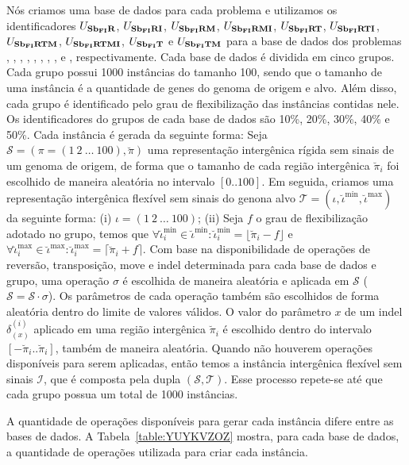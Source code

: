 Nós criamos uma base de dados para cada problema e utilizamos os identificadores $U_{\textbf{Sb\textsubscript{FI}R}}{}$, $U_{\textbf{Sb\textsubscript{FI}RI}}{}$, $U_{\textbf{Sb\textsubscript{FI}RM}}{}$, $U_{\textbf{Sb\textsubscript{FI}RMI}}{}$, $U_{\textbf{Sb\textsubscript{FI}RT}}{}$, $U_{\textbf{Sb\textsubscript{FI}RTI}}{}$, $U_{\textbf{Sb\textsubscript{FI}RTM}}{}$, $U_{\textbf{Sb\textsubscript{FI}RTMI}}{}$, $U_{\textbf{Sb\textsubscript{FI}T}}{}$ e $U_{\textbf{Sb\textsubscript{FI}TM}}{}$ para a base de dados dos problemas \SbFIR{}, \SbFIRI{}, \SbFIRM{}, \SbFIRMI{}, \SbFIRT{}, \SbFIRTI{}, \SbFIRTM{}, \SbFIRTMI{}, \SbFIT{} e \SbFITM{}, respectivamente. Cada base de dados é dividida em cinco grupos. Cada grupo possui 1000 instâncias do tamanho 100, sendo que o tamanho de uma instância é a quantidade de genes do genoma de origem e alvo. Além disso, cada grupo é identificado pelo grau de flexibilização das instâncias contidas nele. Os identificadores do grupos de cada base de dados são 10\%, 20\%, 30\%, 40\% e 50\%. Cada instância é gerada da seguinte forma: Seja $\mathcal{S} = (\pi =(1~2~\dots~100),\breve\pi)$ uma representação intergênica rígida sem sinais de um genoma de origem, de forma que o tamanho de cada região intergênica $\breve\pi_i$ foi escolhido de maneira aleatória no intervalo $[0..100]$. Em seguida, criamos uma representação intergênica flexível sem sinais do genona alvo $\mathcal{T} = (\iota, \breve\iota^{\min},\breve\iota^{\max})$ da seguinte forma: (i) $\iota =(1~2~\dots~100)$; (ii) Seja $f$ o grau de flexibilização adotado no grupo, temos que $\forall \breve\iota^{\min}_i \in \breve\iota^{\min}: \breve\iota^{\min}_i = \lfloor\breve\pi_i - f\rfloor$ e $\forall \breve\iota^{\max}_i \in \breve\iota^{\max} : \breve\iota^{\max}_i = \lceil\breve\pi_i + f\rceil$. Com base na disponibilidade de operações de reversão, transposição, move e indel determinada para cada base de dados e grupo, uma operação $\sigma$ é escolhida de maneira aleatória e aplicada em $\mathcal{S}$ ($\mathcal{S} = \mathcal{S} \cdot \sigma$). Os parâmetros de cada operação também são escolhidos de forma aleatória dentro do limite de valores válidos. O valor do parâmetro $x$ de um indel $\delta^{(i)}_{(x)}$ aplicado em uma região intergênica $\breve\pi_{i}$ é escolhido dentro do intervalo $[-\breve\pi_{i}..\breve\pi_{i}]$, também de maneira aleatória. Quando não houverem operações disponíveis para serem aplicadas, então temos a instância intergênica flexível sem sinais $\mathcal{I}$, que é composta pela dupla $(\mathcal{S},\mathcal{T})$. Esse processo repete-se até que cada grupo possua um total de 1000 instâncias. 

A quantidade de operações disponíveis para gerar cada instância difere entre as bases de dados. A Tabela~\ref{table:YUYKVZOZ} mostra, para cada base de dados, a quantidade de operações utilizada para criar cada instância.

